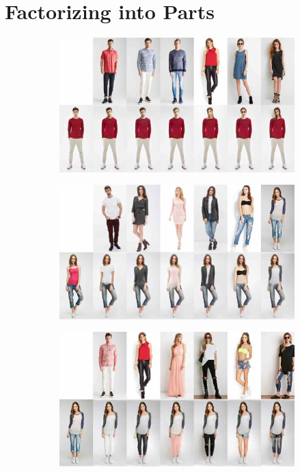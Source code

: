 	\section{Factorizing into Parts}
	\begin{figure}[ht]
		\begin{subfigure}{0.49\linewidth}
		\centering
		\includegraphics[trim={0cm 0cm 0cm 0cm},clip, width=1.\linewidth]{fig/factor/part6_01}\caption{}
		\label{fig:part3_00}
		\end{subfigure}
		\begin{subfigure}{0.49\linewidth}
		\centering
		\includegraphics[trim={0cm 0cm 0cm 0cm},clip, width=1.\linewidth]{fig/factor/part6_10}\caption{}
		\label{fig:part3_11}
		\end{subfigure}
		\begin{subfigure}{0.49\linewidth}
		\centering
		\includegraphics[trim={0cm 0cm 0cm 0cm},clip, width=1.\linewidth]{fig/factor/part6_21}\caption{}

\end{subfigure}
\end{figure}
